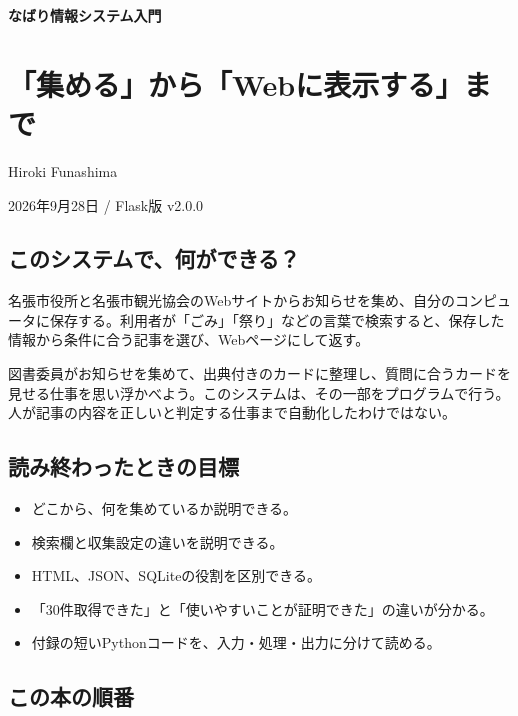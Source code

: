\documentclass[a4paper,10pt]{ltjsarticle}
\begin{document}
{\fontsize{25}{35}\selectfont\bfseries\sffamily\color{Blue}なばり情報システム入門\par}\vspace{8pt}

\section*{「集める」から「Webに表示する」まで}
Hiroki Funashima
\vspace{\fill}

2026年9月28日 / Flask版 v2.0.0
\clearpage


\subsection*{このシステムで、何ができる？}

名張市役所と名張市観光協会のWebサイトからお知らせを集め、自分のコンピュータに保存する。利用者が「ごみ」「祭り」などの言葉で検索すると、保存した情報から条件に合う記事を選び、Webページにして返す。


図書委員がお知らせを集めて、出典付きのカードに整理し、質問に合うカードを見せる仕事を思い浮かべよう。このシステムは、その一部をプログラムで行う。人が記事の内容を正しいと判定する仕事まで自動化したわけではない。


\subsection*{読み終わったときの目標}

\begin{itemize}

\item どこから、何を集めているか説明できる。

\item 検索欄と収集設定の違いを説明できる。

\item HTML、JSON、SQLiteの役割を区別できる。

\item 「30件取得できた」と「使いやすいことが証明できた」の違いが分かる。

\item 付録の短いPythonコードを、入力・処理・出力に分けて読める。

\end{itemize}

\subsection*{この本の順番}
\end{document}
